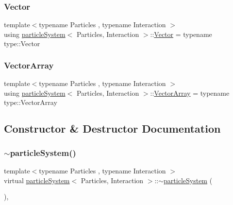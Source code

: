 \subsubsection{\texorpdfstring{Vector}{Vector}}
{\footnotesize\ttfamily template$<$typename Particles , typename Interaction $>$ \\
using \mbox{\hyperlink{classparticle_system}{particle\+System}}$<$ Particles, Interaction $>$\+::\mbox{\hyperlink{classparticle_system_a76c99c2b05db108a24c6e6ccbbd93af1}{Vector}} =  typename type\+::\+Vector}

\mbox{\label{classparticle_system_ac8049667a0d05e76b836642503a71c12}} 
\subsubsection{\texorpdfstring{Vector\+Array}{VectorArray}}
{\footnotesize\ttfamily template$<$typename Particles , typename Interaction $>$ \\
using \mbox{\hyperlink{classparticle_system}{particle\+System}}$<$ Particles, Interaction $>$\+::\mbox{\hyperlink{classparticle_system_ac8049667a0d05e76b836642503a71c12}{Vector\+Array}} =  typename type\+::\+Vector\+Array}



\subsection{Constructor \& Destructor Documentation}
\mbox{\label{classparticle_system_a56d066b7151be7bdb05f64349d44581e}} 
\subsubsection{\texorpdfstring{$\sim$particle\+System()}{~particleSystem()}}
{\footnotesize\ttfamily template$<$typename Particles , typename Interaction $>$ \\
virtual \mbox{\hyperlink{classparticle_system}{particle\+System}}$<$ Particles, Interaction $>$\+::$\sim$\mbox{\hyperlink{classparticle_system}{particle\+System}} (\begin{DoxyParamCaption}{ }\end{DoxyParamCaption})\hspace{0.3cm}{\ttfamily [inline]}, {\ttfamily [virtual]}}



